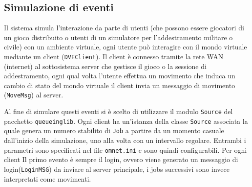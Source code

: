\documentclass[a4paper, 11pt, oneside]{book}
\newcommand{\files}[1]{\texttt{#1}}
\theoremstyle{definition}
\theoremstyle{remark}
\begin{document}
\subsection{Simulazione di eventi}
Il sistema simula l'interazione da parte di utenti (che possono essere giocatori
di un gioco distribuito o utenti di un simulatore per l'addestramento militare
o civile) con un ambiente virtuale, ogni utente può interagire con il mondo
virtuale mediante un client (\files{DVEClient}). Il client è connesso tramite
la rete WAN (internet) al sottosistema server che gestisce il gioco o la
sessione di addestramento, ogni qual volta l'utente effettua un movimento che
induca un cambio di stato del mondo virtuale il client invia un messaggio di
movimento (\files{MoveMsg}) al server.

Al fine di simulare questi eventi si è
scelto di utilizzare il modulo \files{Source} del pacchetto \files{queueinglib}.
Ogni client ha un'istanza della classe \files{Source} associata la quale genera
un numero stabilito di \files{Job} a partire da un momento casuale dall'inizio
della simulazione, uno alla volta con un intervallo regolare. Entrambi i
parametri sono specificati nel file \files{omnet.ini} e sono quindi
configurabili. Per ogni client Il primo evento è sempre il login, ovvero viene
generato un messaggio di login(\files{LoginMSG}) da inviare al server principale,
i jobs successivi sono invece interpretati come movimenti. 
\end{document}
